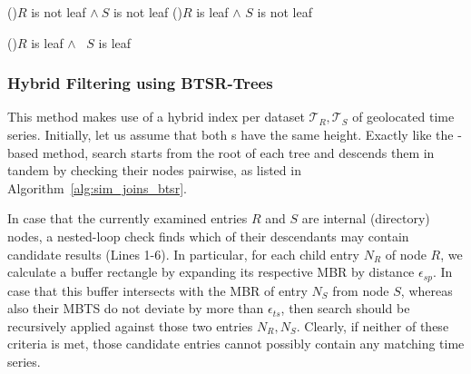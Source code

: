 \begin{algorithm}[!ht]
  \DontPrintSemicolon
  \begin{footnotesize}
  \BlankLine
  \If(){$R$ is not leaf $\land \ S$ is not leaf}{
  }
  \ElseIf(){$R$ is leaf $\land$ $S$ is not leaf}{
  }

  \ElseIf(){$R$ is leaf $\land$ \  $S$ is leaf}{
  }
  \end{footnotesize}
  \caption{$SimJoinSAX(R, S, \epsilon_{sp}, \epsilon_{ts})$}
  \label{alg:sim_joins_isax}
\end{algorithm}

\subsubsection{Hybrid Filtering using BTSR-Trees}
\label{subsubsec:btsr_appr}
This method makes use of a hybrid \btsr index per dataset $\mathcal{T}_{R}, \mathcal{T}_{S}$ of geolocated time series. Initially, let us assume that both {\btsr}s have the same height. Exactly like the  \isax-based method, search starts from the root of each tree and descends them in tandem by checking their nodes pairwise, as listed in Algorithm~\ref{alg:sim_joins_btsr}.

In case that the currently examined entries $R$ and $S$ are internal (directory) nodes, a nested-loop check finds which of their descendants may contain candidate results (Lines 1-6). In particular, for each child entry $N_R$ of node $R$, we calculate a buffer rectangle by expanding its respective MBR by distance $\epsilon_{sp}$. In case that this buffer intersects with the MBR of entry $N_S$ from node $S$, whereas also their MBTS do not deviate by more than $\epsilon_{ts}$, then search should be recursively applied against those two entries $N_R, N_S$. Clearly, if neither of these criteria is met, those candidate entries cannot possibly contain any matching time series. 

